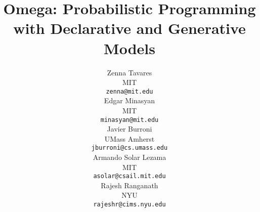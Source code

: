 \documentclass{article}
\title{Omega: Probabilistic Programming with Declarative and Generative Models}
\author{
  Zenna Tavares\\
  MIT\\
  \texttt{zenna@mit.edu}\\
  \And
  Edgar Minasyan \\
  MIT \\
  \texttt{minasyan@mit.edu} \\
  \And
  Javier Burroni \\
  UMass Amherst \\
  \texttt{jburroni@cs.umass.edu} \\
  \And
  Armando Solar Lezama \\
  MIT \\
  \texttt{asolar@csail.mit.edu}\\
  \And
  Rajesh Ranganath \\
  NYU \\
  \texttt{rajeshr@cims.nyu.edu} \\
}
\theoremstyle{definition} %
\begin{document}

\maketitle

\begin{abstract}

\end{abstract}




{

}
% 
\end{document}
